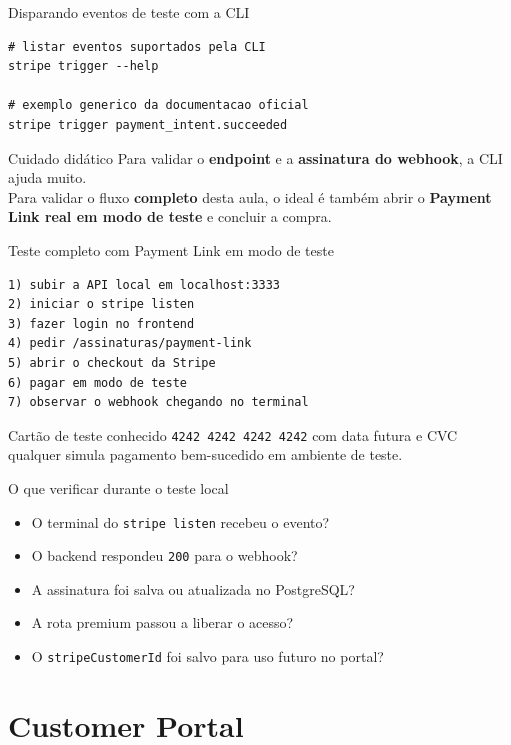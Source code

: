 \documentclass[aspectratio=169]{beamer}
\newcommand{\code}[1]{\texttt{#1}}
\begin{document}
\begin{frame}[fragile]{Disparando eventos de teste com a CLI}
\begin{lstlisting}[language={}]
# listar eventos suportados pela CLI
stripe trigger --help

# exemplo generico da documentacao oficial
stripe trigger payment_intent.succeeded
\end{lstlisting}

\begin{block}{Cuidado didático}
Para validar o \textbf{endpoint} e a \textbf{assinatura do webhook}, a CLI ajuda muito.\\
Para validar o fluxo \textbf{completo} desta aula, o ideal é também abrir o \textbf{Payment Link real em modo de teste} e concluir a compra.
\end{block}
\end{frame}

\begin{frame}[fragile]{Teste completo com Payment Link em modo de teste}
\begin{lstlisting}[language={}]
1) subir a API local em localhost:3333
2) iniciar o stripe listen
3) fazer login no frontend
4) pedir /assinaturas/payment-link
5) abrir o checkout da Stripe
6) pagar em modo de teste
7) observar o webhook chegando no terminal
\end{lstlisting}

\begin{exampleblock}{Cartão de teste conhecido}
\code{4242 4242 4242 4242} com data futura e CVC qualquer simula pagamento bem-sucedido em ambiente de teste.
\end{exampleblock}
\end{frame}

\begin{frame}{O que verificar durante o teste local}
\begin{itemize}
  \item O terminal do \code{stripe listen} recebeu o evento?
  \item O backend respondeu \code{200} para o webhook?
  \item A assinatura foi salva ou atualizada no PostgreSQL?
  \item A rota premium passou a liberar o acesso?
  \item O \code{stripeCustomerId} foi salvo para uso futuro no portal?
\end{itemize}
\end{frame}

\section{Customer Portal}
\end{document}
